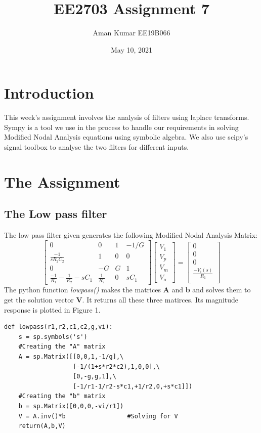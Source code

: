 \documentclass[11pt, a4paper]{article}
\title{EE2703 Assignment 7}
\author{Aman Kumar EE19B066}
\date{May 10, 2021}
\begin{document}
\maketitle

\section{Introduction}
This week's assignment involves the analysis of filters using laplace transforms. Sympy is a tool we use in the process to handle our requirements in solving Modified Nodal Analysis equations using symbolic algebra.
We also use scipy's signal toolbox to analyse the two filters for different inputs.
\section{The Assignment}
\subsection{The Low pass filter}
    The low pass filter given generates the following Modified Nodal Analysis Matrix:
    \[
    \begin{bmatrix}
        0   & 0 & 1  & -1/G \\
        \frac{-1}{sR_2C_2}  & 1 & 0 & 0\\
        0  & -G & G & 1 \\
        \frac{-1}{R_1} - \frac{1}{R_2} - sC_1 & \frac{1}{R_2} & 0 & sC_1
    \end{bmatrix}
    \begin{bmatrix}
        V_1\\
        V_p\\
        V_m \\
        V_o
    \end{bmatrix}
    =
    \begin{bmatrix}
        0 \\
        0 \\
        0 \\
        \frac{-V_i(s)}{R_1} \\
        
    \end{bmatrix}
    \]
    The python function \textit{lowpass()} makes the matrices \textbf{A} and \textbf{b} and solves them to get the solution vector \textbf{V}. It returns all these three matirces. Its magnitude response is plotted in Figure 1.
    \begin{verbatim}
def lowpass(r1,r2,c1,c2,g,vi):
    s = sp.symbols('s')
    #Creating the "A" matrix
    A = sp.Matrix([[0,0,1,-1/g],\
                   [-1/(1+s*r2*c2),1,0,0],\
                   [0,-g,g,1],\
                   [-1/r1-1/r2-s*c1,+1/r2,0,+s*c1]])
    #Creating the "b" matrix
    b = sp.Matrix([0,0,0,-vi/r1])
    V = A.inv()*b                 #Solving for V
    return(A,b,V)
    \end{verbatim}
\end{document}
